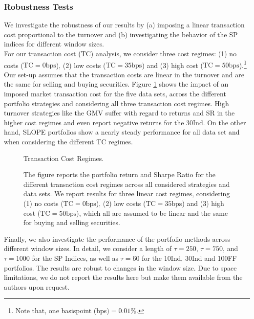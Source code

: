 \documentclass[12pt, a4paper]{article}
\begin{document}
\subsubsection*{Robustness Tests}
We investigate the robustness of our results by (a) imposing a linear transaction cost proportional to the turnover and (b) investigating the behavior of the SP indices for different window sizes.\\
For our transaction cost (TC) analysis, we consider three cost regimes: (1) no costs ($\text{TC} = 0 \text{bps}$), (2) low costs ($\text{TC}=35 \text{bps}$) and (3) high cost ($\text{TC}=50 \text{bps}$).\footnote{Note that, one basispoint (bps)$ = 0.01\%$.} Our set-up assumes that the transaction costs are linear in the turnover and are the same for selling and buying securities. Figure \ref{TC} shows the impact of an imposed market transaction cost for the five data sets, across the different portfolio strategies and considering all three transaction cost regimes. High turnover strategies like the GMV suffer with regard to returns and SR in the higher cost regimes and even report negative returns for the 30Ind. On the other hand, SLOPE portfolios show a nearly steady performance for all data set and when considering the different TC regimes.\\
%
\begin{figure} [h!]
\centering
\caption{Transaction Cost Regimes.}\label{TC}
\captionsetup{font=scriptsize,labelfont=scriptsize, width=\textwidth}
\caption*{The figure reports the portfolio return and Sharpe Ratio for the different transaction cost regimes across all considered strategies and data sets. We report results for three linear cost regimes, considering (1) no costs ($\text{TC} = 0 \text{bps}$), (2) low costs ($\text{TC}=35 \text{bps}$) and (3) high cost ($\text{TC}=50 \text{bps}$), which all are assumed to be linear and the same for buying and selling securities.}
\end{figure}
%
Finally, we also investigate the performance of the portfolio methods across different window sizes. In detail, we consider a length of $\tau = 250$, $\tau = 750$, and $\tau = 1000$ for the SP Indices, as well as $\tau = 60$ for the 10Ind, 30Ind and 100FF portfolios. The results are robust to changes in the window size. Due to space limitations, we do not report the results here but make them available from the authors upon request.
\end{document}

